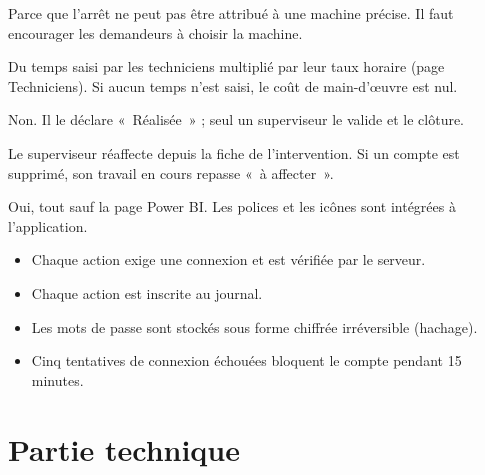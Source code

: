 \documentclass[11pt,a4paper]{article}
\begin{document}
\begin{retenir}
Parce que l'arrêt ne peut pas être attribué à une machine précise. Il faut encourager les demandeurs à choisir la machine.
\end{retenir}

\begin{retenir}
Du temps saisi par les techniciens multiplié par leur taux horaire (page Techniciens). Si aucun temps n'est saisi, le coût de main-d'\oe uvre est nul.
\end{retenir}

\begin{retenir}
Non. Il le déclare «~Réalisée~» ; seul un superviseur le valide et le clôture.
\end{retenir}

\begin{retenir}
Le superviseur réaffecte depuis la fiche de l'intervention. Si un compte est supprimé, son travail en cours repasse «~à affecter~».
\end{retenir}

\begin{retenir}
Oui, tout sauf la page Power BI. Les polices et les icônes sont intégrées à l'application.
\end{retenir}

\begin{retenir}
\begin{itemize}
  \item Chaque action exige une connexion et est vérifiée par le serveur.
  \item Chaque action est inscrite au journal.
  \item Les mots de passe sont stockés sous forme chiffrée irréversible (hachage).
  \item Cinq tentatives de connexion échouées bloquent le compte pendant 15 minutes.
\end{itemize}
\end{retenir}

\part{Partie technique}
\end{document}

